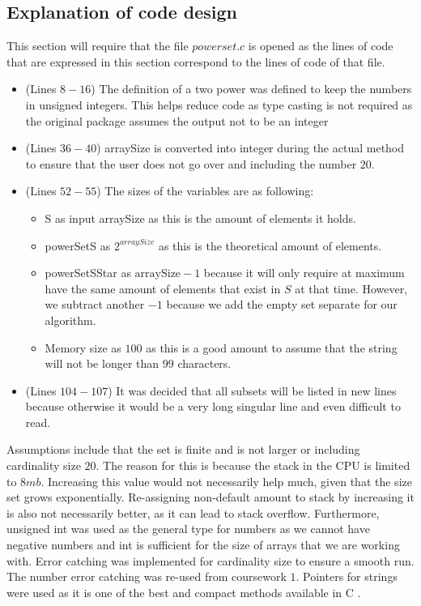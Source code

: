 \documentclass[a4paper]{article}
\theoremstyle{plain}
\theoremstyle{definition}
\theoremstyle{remark}
\begin{document}
\subsection{Explanation of code design}
This section will require that the file $powerset.c$ is opened as the lines of code that are expressed in this section correspond to the lines of code of that file.
\begin{itemize}
	\item (Lines $8-16$) The definition of a two power was defined to keep the numbers in unsigned integers. This helps reduce code as type casting is not required as the original package assumes the output not to be an integer
	\item (Lines $36-40$) arraySize is converted into integer during the actual method to ensure that the user does not go over and including the number $20$. 
	\item (Lines $52-55$) The sizes of the variables are as following:
		\begin{itemize}
			\item S as input arraySize as this is the amount of elements it holds.
			\item powerSetS as $2^{arraySize}$ as this is the theoretical amount of elements.
			\item powerSetSStar as $\text{arraySize}-1$ because it will only require at maximum have the same amount of elements that exist in $S$ at that time. However, we subtract another $-1$ because we add the empty set separate for our algorithm.
			\item Memory size as $100$ as this is a good amount to assume that the string will not be longer than $99$ characters.
		\end{itemize}
	\item (Lines $104-107$) It was decided that all subsets will be listed in new lines because otherwise it would be a very long singular line and even difficult to read.
\end{itemize}
Assumptions include that the set is finite and is not larger or including cardinality size $20$. The reason for this is because the stack in the CPU is limited to $8mb$. Increasing this value would not necessarily help much, given that the size set grows exponentially. Re-assigning non-default amount to stack by increasing it is also not necessarily better, as it can lead to stack overflow. Furthermore, unsigned int was used as the general type for numbers as we cannot have negative numbers and int is sufficient for the size of arrays that we are working with. Error catching was implemented for cardinality size to ensure a smooth run. The number error catching was re-used from coursework $1$. Pointers for strings were used as it is one of the best and compact methods available in C \cite{pointer} \cite{pointer2}.
\newpage
\end{document}
